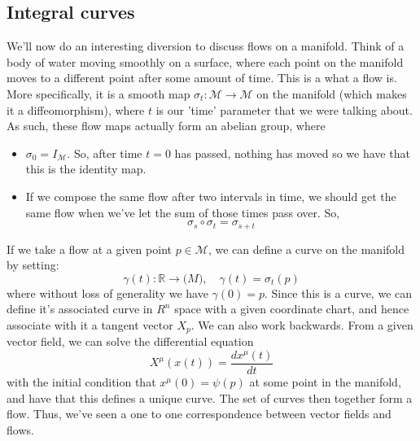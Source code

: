 \subsection{Integral curves} 
We'll now do an interesting diversion to discuss flows on a manifold. Think of a body of water moving smoothly on a surface, where each point on the manifold moves to a different point after some amount of time. This is a what a flow is. More specifically, it is a smooth map $\sigma_t : \mathcal{M} \rightarrow \mathcal{M} $ on the manifold (which makes it a diffeomorphism), where $t$ is our 'time' parameter that we were talking about. As such, these flow maps actually form an abelian group, where 
\begin{itemize} 
\item $\sigma_0 = I_\mathcal{M} $. So, after time $t = 0$ has passed, nothing has moved so we have that this is the identity map. 
\item If we compose the same flow after two intervals in time, we should get the same flow when we've let the sum of those times pass over. So, 
\[ \sigma_s \circ \sigma_t  = \sigma_{ s + t } \] 
\end{itemize} 
If we take a flow at a given point $p \in \mathcal{M}$, we can define a curve on the manifold by setting: 
\[ 
\gamma(t): \mathbb{R} \rightarrow \mathcal(M), \quad \gamma(t) = \sigma_t ( p ) 
\] where without loss of generality we have $\gamma(0) = p$. Since this is a curve, we can define it's associated curve in $R^n$ space with a given coordinate chart, and hence associate with it a tangent vector $X_p$. We can also work backwards. From a given vector field, we can solve the differential equation 
\[ 	
X^\mu ( x(t) )  = \frac{ d x^\mu ( t) }{ dt} 
\] with the initial condition that $x^\mu ( 0 )  = \psi ( p ) $ at some point in the manifold, and have that this defines a unique curve. The set of curves then together form a flow. 
Thus, we've seen a one to one correspondence between vector fields and flows. 	
\pagebreak 

